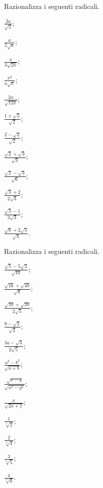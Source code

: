 \begin{esercizio}[\Ast]
 \label{ese:2.70}
Razionalizza i seguenti radicali.
 \begin{multicols}{4}
 \begin{enumeratea}
 \item $\frac{2a}{\sqrt 2}$;
 \item $\frac a{2\sqrt a}$;
 \item $\frac x{3\sqrt{2x}}$;
 \item $\frac{x^2}{a\sqrt x}$;
 \item $\frac{3x}{\sqrt{12x}}$;
 \item $\frac{1+\sqrt 2}{\sqrt 2}$;
 \item $\frac{2-\sqrt 2}{\sqrt 2}$;
 \item $\frac{\sqrt 2+\sqrt 3}{\sqrt 3}$;
 \item $\frac{\sqrt 2-\sqrt 3}{\sqrt 6}$;
 \item $\frac{\sqrt 3+2}{2\sqrt 3}$;
 \item $\frac{\sqrt 3-1}{3\sqrt 3}$;
 \item $\frac{\sqrt 6+2\sqrt 3}{\sqrt 3}$.
 \end{enumeratea}
 \end{multicols}
\end{esercizio}

\begin{esercizio}[\Ast]
 \label{ese:2.71}
Razionalizza i seguenti radicali.
 \begin{multicols}{4}
 \begin{enumeratea}
 \item $\frac{\sqrt 5-5\sqrt 2}{\sqrt{10}}$;
 \item $\frac{\sqrt{16}+\sqrt{40}}{\sqrt 8}$;
 \item $\frac{\sqrt{10}+\sqrt{20}}{2\sqrt 5}$;
 \item $\frac{9-\sqrt 2}{\sqrt 2}$;
 \item $\frac{3a-\sqrt 3}{2\sqrt 5}$;
 \item $\frac{a^2-b^2}{\sqrt{a+b}}$;
 \item $\frac{\sqrt{x-y}}{\sqrt{x^2-y^2}}$;
 \item $\frac x{\sqrt{2x+1}}$;
 \item $\frac 1{\sqrt[3]2}$;
 \item $\frac 2{\sqrt[3]4}$;
 \item $\frac 3{\sqrt[3]5}$;
 \item $\frac 4{\sqrt[3]6}$.
 \end{enumeratea}
 \end{multicols}
\end{esercizio}

